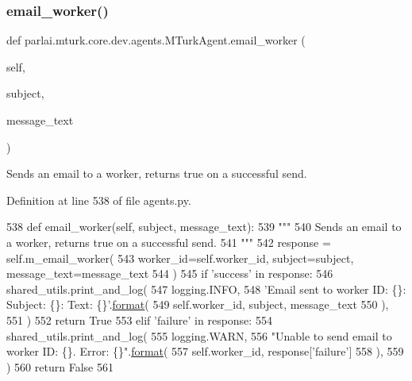 \subsubsection{\texorpdfstring{email\+\_\+worker()}{email\_worker()}}
{\footnotesize\ttfamily def parlai.\+mturk.\+core.\+dev.\+agents.\+M\+Turk\+Agent.\+email\+\_\+worker (\begin{DoxyParamCaption}\item[{}]{self,  }\item[{}]{subject,  }\item[{}]{message\+\_\+text }\end{DoxyParamCaption})}

\begin{DoxyVerb}Sends an email to a worker, returns true on a successful send.
\end{DoxyVerb}
 

Definition at line 538 of file agents.\+py.


\begin{DoxyCode}
538     \textcolor{keyword}{def }email\_worker(self, subject, message\_text):
539         \textcolor{stringliteral}{"""}
540 \textcolor{stringliteral}{        Sends an email to a worker, returns true on a successful send.}
541 \textcolor{stringliteral}{        """}
542         response = self.m\_email\_worker(
543             worker\_id=self.worker\_id, subject=subject, message\_text=message\_text
544         )
545         \textcolor{keywordflow}{if} \textcolor{stringliteral}{'success'} \textcolor{keywordflow}{in} response:
546             shared\_utils.print\_and\_log(
547                 logging.INFO,
548                 \textcolor{stringliteral}{'Email sent to worker ID: \{\}: Subject: \{\}: Text: \{\}'}.\hyperlink{namespaceparlai_1_1chat__service_1_1services_1_1messenger_1_1shared__utils_a32e2e2022b824fbaf80c747160b52a76}{format}(
549                     self.worker\_id, subject, message\_text
550                 ),
551             )
552             \textcolor{keywordflow}{return} \textcolor{keyword}{True}
553         \textcolor{keywordflow}{elif} \textcolor{stringliteral}{'failure'} \textcolor{keywordflow}{in} response:
554             shared\_utils.print\_and\_log(
555                 logging.WARN,
556                 \textcolor{stringliteral}{"Unable to send email to worker ID: \{\}. Error: \{\}"}.\hyperlink{namespaceparlai_1_1chat__service_1_1services_1_1messenger_1_1shared__utils_a32e2e2022b824fbaf80c747160b52a76}{format}(
557                     self.worker\_id, response[\textcolor{stringliteral}{'failure'}]
558                 ),
559             )
560             \textcolor{keywordflow}{return} \textcolor{keyword}{False}
561 
\end{DoxyCode}
\mbox{\label{classparlai_1_1mturk_1_1core_1_1dev_1_1agents_1_1MTurkAgent_afd7f0e409db68b1f61b3a82f3c05cee1}} 
